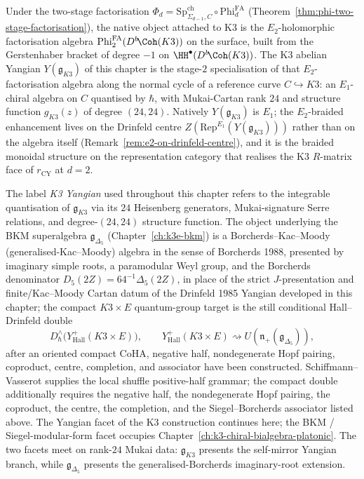\begin{remark}
\label{rem:k3-yangian-stage-discipline}
Under the two-stage factorisation
$\Phi_d = \mathrm{Sp}^{\mathrm{ch}}_{\Sigma_{d-1},C}\circ\mathrm{Phi}^{\mathrm{FA}}_d$
(Theorem~\ref{thm:phi-two-stage-factorisation}), the native object
attached to K3 is the $E_2$-holomorphic factorisation algebra
$\mathrm{Phi}^{\mathrm{FA}}_2(D^b\!\Coh(K3))$ on the surface, built
from the Gerstenhaber bracket of degree $-1$ on
$\HH^\bullet(D^b\!\Coh(K3))$. The K3 abelian Yangian
$Y(\mathfrak g_{K3})$ of this chapter is the stage-$2$ specialisation
of that $E_2$-factorisation algebra along the normal cycle of a
reference curve $C\hookrightarrow K3$: an $E_1$-chiral algebra on $C$
quantised by $\hbar$, with Mukai-Cartan rank $24$ and structure function
$g_{K3}(z)$ of degree $(24,24)$. Natively $Y(\mathfrak g_{K3})$ is
$E_1$; the $E_2$-braided enhancement lives on the Drinfeld centre
$Z(\mathrm{Rep}^{E_1}(Y(\mathfrak g_{K3})))$ rather than on the algebra
itself (Remark~\ref{rem:e2-on-drinfeld-centre}), and it is the
braided monoidal structure on the representation category that
realises the K3 $R$-matrix face of $r_{\mathrm{CY}}$ at $d = 2$.
\end{remark}

\begin{remark}
\label{rem:k3-yangian-nomenclature-scope}
The label \emph{K3 Yangian} used throughout this chapter refers to the integrable
quantisation of $\mathfrak{g}_{K3}$ via its $24$ Heisenberg generators, Mukai-signature
Serre relations, and degree-$(24,24)$ structure function. The object underlying the
BKM superalgebra $\mathfrak{g}_{\Delta_5}$ (Chapter~\ref{ch:k3e-bkm}) is a
Borcherds--Kac--Moody (generalised-Kac--Moody) algebra in the sense of
Borcherds 1988, presented by imaginary simple roots, a paramodular Weyl
group, and the Borcherds denominator
$D_5(2Z)=64^{-1}\Delta_5(2Z)$, in place of the strict
$J$-presentation and finite/Kac--Moody Cartan datum of the Drinfeld
1985 Yangian developed in this chapter; the compact $K3\times E$ quantum-group
target is the still conditional Hall--Drinfeld double
\[
 D^\wedge_\hbar\!\bigl(Y^+_{\mathrm{Hall}}(K3\times E)\bigr),
 \qquad
 Y^+_{\mathrm{Hall}}(K3\times E)\rightsquigarrow
 U(\mathfrak n_+(\mathfrak g_{\Delta_5})),
\]
after an oriented compact CoHA, negative half, nondegenerate Hopf
pairing, coproduct, centre, completion, and associator have been
constructed. Schiffmann--Vasserot supplies the local shuffle
positive-half grammar; the compact double additionally requires the
negative half, the nondegenerate Hopf pairing, the coproduct, the
centre, the completion, and the Siegel--Borcherds associator listed
above. The Yangian facet of the K3 construction continues here; the
BKM / Siegel-modular-form facet occupies
Chapter~\ref{ch:k3-chiral-bialgebra-platonic}. The two facets meet on
rank-$24$ Mukai data: $\mathfrak{g}_{K3}$ presents the self-mirror
Yangian branch, while $\mathfrak{g}_{\Delta_5}$ presents the
generalised-Borcherds imaginary-root extension.
\end{remark}


